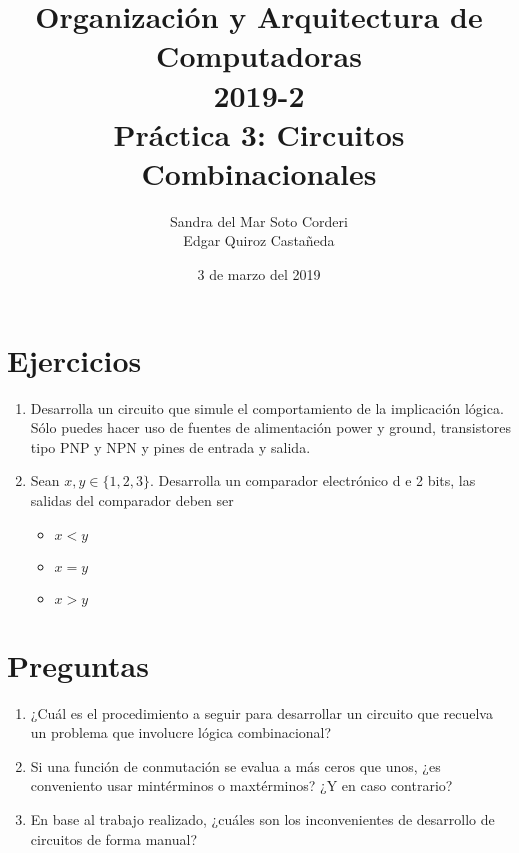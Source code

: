\documentclass{article}
\begin{document}
    \title{
        Organización y Arquitectura de Computadoras \\
        2019-2 \\
        Práctica 3: Circuitos Combinacionales
    }
    \author{
        Sandra del Mar Soto Corderi \\
        Edgar Quiroz Castañeda
    }
    \date{
        3 de marzo del 2019
    }

    \maketitle

    \section{Ejercicios}

    \begin{enumerate}
        \item {
            Desarrolla un circuito que simule el comportamiento de la implicación
            lógica. Sólo puedes hacer uso de fuentes de alimentación power y 
            ground, transistores tipo PNP y NPN y pines de entrada y salida. 
        }
        \item {
            Sean $x, y \in \{1, 2, 3\}$. Desarrolla un comparador electrónico d
            e 2 bits, las salidas del comparador deben ser
            \begin{itemize}
                \item {
                    $x<y$
                }
                \item {
                    $x=y$
                }
                \item {
                    $x>y$
                }
            \end{itemize}
        }
    \end{enumerate}

    \section{Preguntas}

    \begin{enumerate}
        \item {
            ¿Cuál es el procedimiento a seguir para desarrollar un circuito que 
            recuelva un problema que involucre lógica combinacional?
        }
        \item {
            Si una función de conmutación se evalua a más ceros que unos, ¿es
            conveniento usar mintérminos o maxtérminos? ¿Y en caso contrario?
        }
        \item {
            En base al trabajo realizado, ¿cuáles son los inconvenientes de 
            desarrollo de circuitos de forma manual?
        }
    \end{enumerate}
\end{document}

